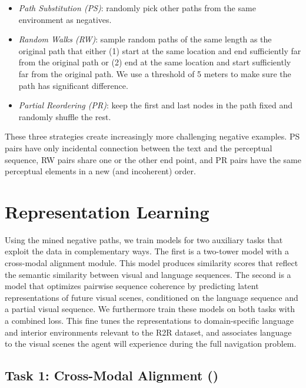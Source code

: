 \documentclass[10pt,twocolumn,letterpaper]{article}
\begin{document}
\begin{itemize}
    \setlength \itemsep{0em}
    \item \textit{Path Substitution (PS)}: randomly pick other paths from the same environment as negatives.
    \item \textit{Random Walks (RW)}: sample random paths of the same length as the original path that either (1) start at the same location and end sufficiently far from the original path or (2) end at the same location and start sufficiently far from the original path. We use a threshold of 5 meters to make sure the path has significant difference.  
    \item \textit{Partial Reordering (PR)}: keep the first and last nodes in the path fixed and randomly shuffle the rest.
\end{itemize}

\noindent
These three strategies create increasingly more challenging negative examples. PS pairs have only incidental connection between the text and the perceptual sequence, RW pairs share one or the other end point, and PR pairs have the same perceptual elements in a new (and incoherent) order. 
\section{Representation Learning}
\label{sec:representation_learning}




Using the mined negative paths, we train models for two auxiliary tasks that exploit the data in complementary ways. The first is a two-tower model \cite{Gillick:2018:DualEncoders,Serban:2018:DualEncoders} with a cross-modal alignment module. This model produces similarity scores that reflect the semantic similarity between visual and language sequences. The second is a model that optimizes pairwise sequence coherence by predicting latent representations of future visual scenes, conditioned on the language sequence and a partial visual sequence. We furthermore train these models on both tasks with a combined loss. This fine tunes the representations to domain-specific language and interior environments relevant to the R2R dataset, and associates language to the visual scenes the agent will experience during the full navigation problem. 



\subsection{Task 1: Cross-Modal Alignment (\taskcma)}
\end{document}

